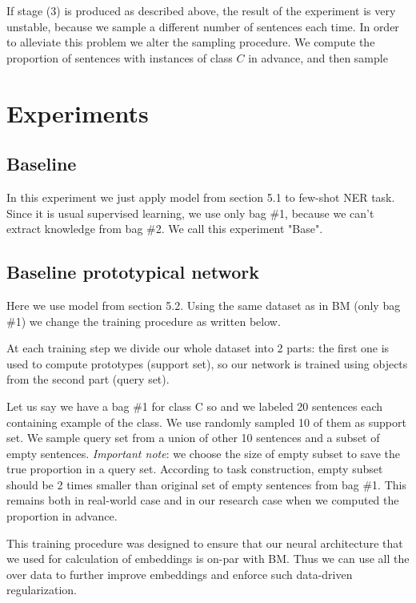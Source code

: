 If stage (3) is produced as described above, the result of the experiment is very unstable, because we sample a different number of sentences each time. In order to alleviate this problem we alter the sampling procedure. We compute the proportion of sentences with instances of class $C$ in advance, and then sample 

\section{Experiments}

\subsection{Baseline}

In this experiment we just apply model from section 5.1 to few-shot NER task. Since it is usual supervised learning, we use only bag \#1, because we can't extract knowledge from bag \#2. We call this experiment "Base".

\subsection{Baseline prototypical network}
Here we use model from section 5.2.
Using the same dataset as in BM (only bag \#1) we change the training procedure as written below. 

At each training step we divide our whole dataset into 2 parts: the first one is used to compute prototypes (support set), so our network is trained using objects from the second part (query set). 

Let us say we have a bag \#1 for class C so and we labeled 20 sentences each containing example of the class.
We use randomly sampled 10 of them as support set. We sample query set from a union of other 10 sentences and a subset of empty sentences. \textit{Important note}: we choose the size of empty subset to save the true proportion in a query set. According to task construction, empty subset should be 2 times smaller than original set of empty sentences from bag \#1. This remains both in real-world case and in our research case when we computed the proportion in advance.

This training procedure was designed to ensure that our neural architecture that we used for calculation of embeddings is on-par with BM. Thus we can use all the over data to further improve embeddings and enforce such data-driven regularization.

